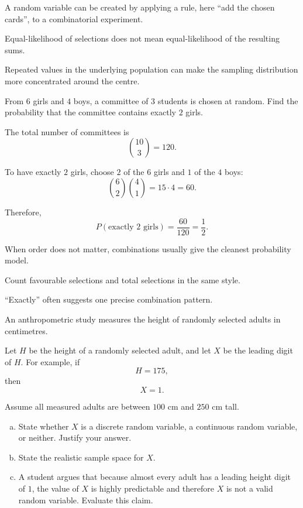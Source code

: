 \begin{takeaways}
\item A random variable can be created by applying a rule, here ``add the chosen cards'', to a combinatorial experiment.
\item Equal-likelihood of selections does not mean equal-likelihood of the resulting sums.
\item Repeated values in the underlying population can make the sampling distribution more concentrated around the centre.
\end{takeaways}

\begin{problem}
From $6$ girls and $4$ boys, a committee of $3$ students is chosen at random. Find the probability that the committee contains exactly $2$ girls.
\end{problem}

\begin{solution}
The total number of committees is
\[
\binom{10}{3}=120.
\]

To have exactly $2$ girls, choose $2$ of the $6$ girls and $1$ of the $4$ boys:
\[
\binom62\binom41=15\cdot 4=60.
\]

Therefore,
\[
P(\text{exactly 2 girls})=\frac{60}{120}=\frac12.
\]
\end{solution}

\begin{takeaways}
\item When order does not matter, combinations usually give the cleanest probability model.
\item Count favourable selections and total selections in the same style.
\item ``Exactly'' often suggests one precise combination pattern.
\end{takeaways}

\begin{problem}
An anthropometric study measures the height of randomly selected adults in centimetres.

Let $H$ be the height of a randomly selected adult, and let $X$ be the leading digit of $H$. For example, if
\[
H=175,
\]
then
\[
X=1.
\]

Assume all measured adults are between $100$ cm and $250$ cm tall.
\begin{enumerate}[(a)]
  \item State whether $X$ is a discrete random variable, a continuous random variable, or neither. Justify your answer.
  \item State the realistic sample space for $X$.
  \item A student argues that because almost every adult has a leading height digit of $1$, the value of $X$ is highly predictable and therefore $X$ is not a valid random variable. Evaluate this claim.
\end{enumerate}
\end{problem}

